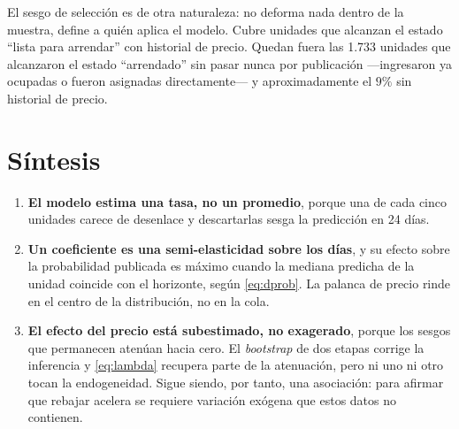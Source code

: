 \documentclass[11pt,a4paper]{article}
\theoremstyle{definition}
\begin{document}
El sesgo de selección es de otra naturaleza: no deforma nada dentro de la muestra,
define a quién aplica el modelo. Cubre unidades que alcanzan el estado ``lista
para arrendar'' con historial de precio. Quedan fuera las 1.733 unidades que
alcanzaron el estado ``arrendado'' sin pasar nunca por publicación ---ingresaron
ya ocupadas o fueron asignadas directamente--- y aproximadamente el $9\%$ sin
historial de precio.

\section{Síntesis}

\begin{enumerate}[leftmargin=1.6em,itemsep=5pt]
\item \textbf{El modelo estima una tasa, no un promedio}, porque una de cada cinco
unidades carece de desenlace y descartarlas sesga la predicción en 24 días.

\item \textbf{Un coeficiente es una semi-elasticidad sobre los días}, y su efecto
sobre la probabilidad publicada es máximo cuando la mediana predicha de la unidad
coincide con el horizonte, según \eqref{eq:dprob}. La palanca de precio rinde en
el centro de la distribución, no en la cola.

\item \textbf{El efecto del precio está subestimado, no exagerado}, porque los
sesgos que permanecen atenúan hacia cero. El \emph{bootstrap} de dos etapas corrige
la inferencia y \eqref{eq:lambda} recupera parte de la atenuación, pero ni uno ni
otro tocan la endogeneidad. Sigue siendo, por tanto, una asociación: para afirmar
que rebajar acelera se requiere variación exógena que estos datos no contienen.
\end{enumerate}
\end{document}
